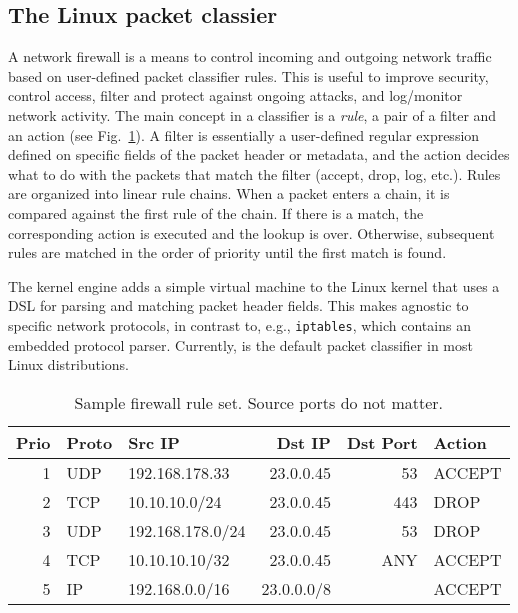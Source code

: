 \subsection{The Linux packet classier}
\label{sec:sa-pack-class}

A network firewall is a means to control incoming and outgoing network traffic based on user-defined packet classifier rules. This is useful to improve security, control access, filter and protect against ongoing attacks, and log\slash monitor network activity. The main concept in a classifier is a \emph{rule}, a pair of a filter and an action (see Fig.~\ref{fig:class-sample}). A filter is essentially a user-defined regular expression defined on specific fields of the packet header or metadata, and the action decides what to do with the packets that match the filter (accept, drop, log, etc.). Rules are organized into linear rule chains. When a packet enters a chain, it is compared against the first rule of the chain. If there is a match, the corresponding action is executed and the lookup is over. Otherwise, subsequent rules are matched in the order of priority until the first match is found.

The \nftables kernel engine adds a simple virtual machine to the Linux kernel that uses a DSL for parsing and matching packet header fields. This makes \nftables agnostic to specific network protocols, in contrast to, e.g., \texttt{iptables}, which contains an embedded protocol parser. Currently, \nftables is the default packet classifier in most Linux distributions.

\begin{table}[t]
  \centering
  \caption{Sample firewall rule set. Source ports do not matter.}
  \label{fig:class-sample}
  \begin{small}
    \renewcommand{\tabcolsep}{2pt}
    \begin{tabular}{r|l|l|r|r|l}
      \textbf{Prio} & \textbf{Proto} & \textbf{Src IP} & \textbf{Dst IP} & \textbf{Dst Port} & \textbf{Action}\\
      \hline
      1 & UDP & 192.168.178.33   & 23.0.0.45  & 53  & ACCEPT\\
      2 & TCP & 10.10.10.0/24    & 23.0.0.45  & 443 & DROP\\
      3 & UDP & 192.168.178.0/24 & 23.0.0.45  & 53  & DROP\\
      4 & TCP & 10.10.10.10/32   & 23.0.0.45  & ANY & ACCEPT\\
      5 & IP  & 192.168.0.0/16   & 23.0.0.0/8 &     & ACCEPT\\
    \end{tabular}
  \end{small}%
\end{table}

